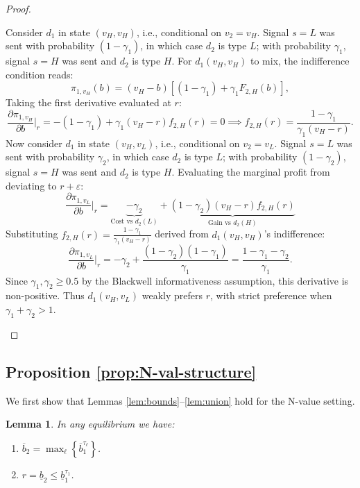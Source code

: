 \documentclass[11pt]{article}
\theoremstyle{plain}
\theoremstyle{definition}
\theoremstyle{plain}
\theoremstyle{plain}
\theoremstyle{plain}
\newtheorem{lem}[thm]{Lemma}
\theoremstyle{plain}
\numberwithin{equation}{section}
\begin{document}
\begin{proof}
\begin{enumerate}
Consider $d_1$ in state $(v_H,v_H)$, i.e., conditional on $v_2=v_H$. Signal $s=L$ was sent with probability $(1-\gamma_1)$, in which case $d_2$ is type $L$; with probability $\gamma_1$, signal $s=H$ was sent and $d_2$ is type $H$. For $d_1(v_H,v_H)$ to mix, the indifference condition reads:
\begin{equation*}
    \pi_{1,v_H}(b) = (v_H-b)\left[(1-\gamma_1) + \gamma_1 F_{2,H}(b)\right],
\end{equation*}
Taking the first derivative evaluated at $r$:
\begin{equation*}
    \frac{\partial \pi_{1,v_H}}{\partial b}\bigg|_{r} = -(1-\gamma_1) + \gamma_1(v_H-r)f_{2,H}(r) = 0 \implies f_{2,H}(r) = \frac{1-\gamma_1}{\gamma_1(v_H-r)}.
\end{equation*}
Now consider $d_1$ in state $(v_H,v_L)$, i.e., conditional on $v_2=v_L$. Signal $s=L$ was sent with probability $\gamma_2$, in which case $d_2$ is type $L$; with probability $(1-\gamma_2)$, signal $s=H$ was sent and $d_2$ is type $H$. Evaluating the marginal profit from deviating to $r+\varepsilon$:
\[
\frac{\partial \pi_{1,v_L}}{\partial b}\bigg|_{r} = \underbrace{-\gamma_2}_{\text{Cost vs } d_2(L)} + \underbrace{(1-\gamma_2)(v_H-r)f_{2,H}(r)}_{\text{Gain vs } d_2(H)}
\]
Substituting $f_{2,H}(r) = \frac{1-\gamma_1}{\gamma_1(v_H-r)}$ derived from $d_1(v_H,v_H)$'s indifference:
\[
\frac{\partial \pi_{1,v_L}}{\partial b}\bigg|_{r} = -\gamma_2 + \frac{(1-\gamma_2)(1-\gamma_1)}{\gamma_1} = \frac{1 - \gamma_1 - \gamma_2}{\gamma_1}.
\]
Since $\gamma_1, \gamma_2 \geq 0.5$ by the Blackwell informativeness assumption, this derivative is non-positive. Thus $d_1(v_H,v_L)$ weakly prefers $r$, with strict preference when $\gamma_1 + \gamma_2 > 1$.
\end{enumerate}
\end{proof}
\vspace{3mm}
\fi

\subsection*{Proposition \ref{prop:N-val-structure}}
We first show that Lemmas \ref{lem:bounds}--\ref{lem:union} hold for the N-value setting.

\begin{lem}\label{lem:N-bounds}
In any equilibrium we have:
\begin{enumerate}
    \item $\overline{b}_2 = \max_{\ell} \left\{ \overline{b}_1^{\tau_\ell} \right\}$.

    \vspace{0.1cm}

    \item $r = \underline{b}_2 \leq \underline{b}_1^{\tau_1}$.
\end{enumerate}
\end{lem}
\end{document}
